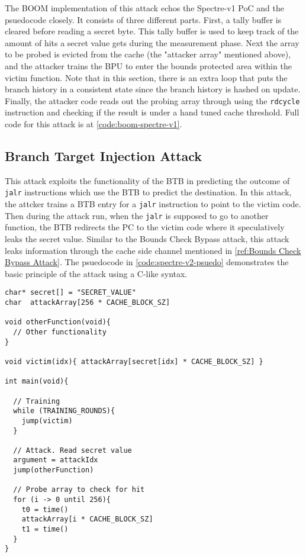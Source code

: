 
The BOOM implementation of this attack echos the Spectre-v1 PoC and the psuedocode closely.
It consists of three different parts. First, a tally buffer is cleared before reading a secret byte.
This tally buffer is used to keep track of the amount of hits a secret value gets during the measurement
phase. Next the array to be probed is evicted from the cache (the "attacker array" mentioned above), and
the attacker trains the BPU to enter the bounds protected area within the victim function. Note that in
this section, there is an extra loop that puts the branch history in a consistent state since the branch
history is hashed on update. Finally, the attacker code reads out the probing array through using the
{\tt rdcycle} instruction and checking if the result is under a hand tuned cache threshold. Full code for 
this attack is at \ref{code:boom-spectre-v1}.

\subsection{Branch Target Injection Attack}

This attack exploits the functionality of the BTB in predicting the outcome
of {\tt jalr} instructions which use the BTB to predict the destination. In this attack,
the attcker trains a BTB entry for a {\tt jalr} instruction to point to 
the victim code. Then during the attack run, when the {\tt jalr} is supposed to go to another function,
the BTB redirects the PC to the victim code where it speculatively leaks the secret value. Similar to the
Bounds Check Bypass attack, this attack leaks information through the
cache side channel mentioned in \ref{ref:Bounds Check Bypass Attack}. The psuedocode in 
\ref{code:spectre-v2-psuedo} demonstrates the basic principle of the attack using a C-like syntax.

\begin{lstlisting}[style=column-code, caption=Psuedocode of Bounds Check Bypass Attack]
char* secret[] = "SECRET_VALUE"
char  attackArray[256 * CACHE_BLOCK_SZ]

void otherFunction(void){
  // Other functionality    
}

void victim(idx){ attackArray[secret[idx] * CACHE_BLOCK_SZ] }

int main(void){
  
  // Training
  while (TRAINING_ROUNDS){
    jump(victim)
  }

  // Attack. Read secret value
  argument = attackIdx
  jump(otherFunction)

  // Probe array to check for hit
  for (i -> 0 until 256){
    t0 = time()
    attackArray[i * CACHE_BLOCK_SZ]
    t1 = time()
  }
}
\end{lstlisting}\label{code:spectre-v2-pseudo}

